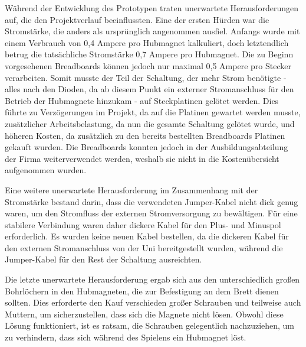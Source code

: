 Während der Entwicklung des Prototypen traten unerwartete Herausforderungen auf, die den Projektverlauf beeinflussten.
Eine der ersten Hürden war die Stromstärke, die anders als ursprünglich angenommen ausfiel. Anfangs wurde mit einem
Verbrauch von 0,4 Ampere pro Hubmagnet kalkuliert, doch letztendlich betrug die tatsächliche Stromstärke 0,7 Ampere pro
Hubmagnet. Die zu Beginn vorgesehenen Breadboards können jedoch nur maximal 0,5 Ampere pro Stecker verarbeiten.
Somit musste der Teil der Schaltung, der mehr Strom benötigte - alles nach den Dioden, da ab diesem Punkt ein externer
Stromanschluss für den Betrieb der Hubmagnete hinzukam - auf Steckplatinen gelötet werden. Dies führte zu Verzögerungen
im Projekt, da auf die Platinen gewartet werden musste, zusätzlicher Arbeitsbelastung, da nun die gesamte Schaltung gelötet
wurde, und höheren Kosten, da zusätzlich zu den bereits bestellten Breadboards Platinen gekauft wurden.
Die Breadboards konnten jedoch in der Ausbildungsabteilung der Firma weiterverwendet werden, weshalb sie nicht in die
Kostenübersicht aufgenommen wurden.

Eine weitere unerwartete Herausforderung im Zusammenhang mit der Stromstärke bestand darin, dass die verwendeten
Jumper-Kabel nicht dick genug waren, um den Stromfluss der externen Stromversorgung zu bewältigen. Für eine stabilere
Verbindung waren daher dickere Kabel für den Plus- und Minuspol erforderlich. Es wurden keine neuen Kabel bestellen,
da die dickeren Kabel für den externen Stromanschluss von der Uni bereitgestellt wurden, während die Jumper-Kabel für den
Rest der Schaltung ausreichten.

Die letzte unerwartete Herausforderung ergab sich aus den unterschiedlich großen Bohrlöchern in den Hubmagneten, die zur
Befestigung an dem Brett dienen sollten. Dies erforderte den Kauf verschieden großer Schrauben und teilweise auch Muttern,
um sicherzustellen, dass sich die Magnete nicht lösen. Obwohl diese Lösung funktioniert, ist es ratsam, die Schrauben
gelegentlich nachzuziehen, um zu verhindern, dass sich während des Spielens ein Hubmagnet löst.

